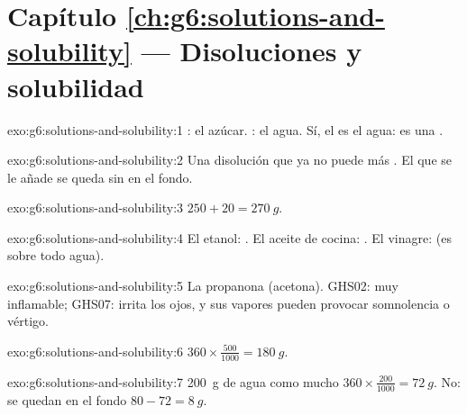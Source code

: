 \section*{Capítulo \ref{ch:g6:solutions-and-solubility} --- Disoluciones y solubilidad}

\begin{solution}{exo:g6:solutions-and-solubility:1}
: el azúcar. : el agua. Sí, el  es el agua: es
una .
\end{solution}

\begin{solution}{exo:g6:solutions-and-solubility:2}
Una disolución que ya no puede  más . El  que se le
añade se queda sin  en el fondo.
\end{solution}

\begin{solution}{exo:g6:solutions-and-solubility:3}
$250 + 20 = \qty{270}{g}$.
\end{solution}

\begin{solution}{exo:g6:solutions-and-solubility:4}
El etanol: . El aceite de cocina: . El vinagre:
 (es sobre todo agua).
\end{solution}

\begin{solution}{exo:g6:solutions-and-solubility:5}
La propanona (acetona). GHS02: muy inflamable; GHS07: irrita los ojos,
y sus vapores pueden provocar somnolencia o vértigo.
\end{solution}

\begin{solution}{exo:g6:solutions-and-solubility:6}
$360 \times \frac{500}{1000} = \qty{180}{g}$.
\end{solution}

\begin{solution}{exo:g6:solutions-and-solubility:7}
\qty{200}{g} de agua  como mucho $360 \times \frac{200}{1000} =
\qty{72}{g}$. No: se quedan en el fondo $80 - 72 = \qty{8}{g}$.
\end{solution}

